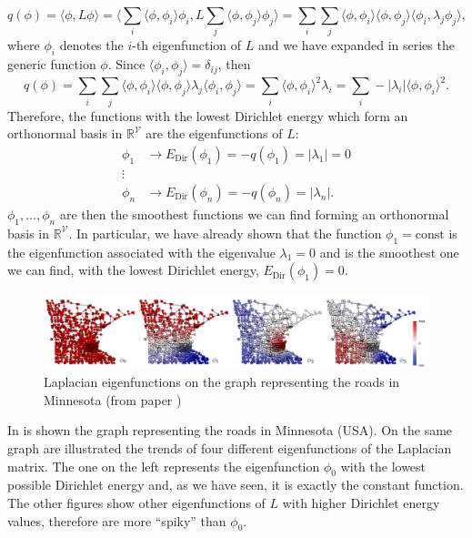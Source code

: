\documentclass[12pt,a4paper]{report}
\theoremstyle{definition}
\begin{document}
\begin{equation*}
    q(\phi) = \langle \phi , L \phi \rangle = 
    \langle \sum _i \langle \phi, \phi _i \rangle \phi _i , L \sum_j \langle \phi, \phi _j \rangle \phi_j \rangle = 
    \sum_i \sum_j \langle \phi, \phi _i \rangle \langle \phi, \phi _j \rangle \langle \phi_i, \lambda_j \phi _j \rangle ,
\end{equation*}
where $\phi_i$ denotes the $i$-th eigenfunction of $L$ and we have expanded in series the generic function $\phi$.
Since $\langle \phi _i, \phi _j \rangle = \delta _{ij}$, then
\begin{equation*}
    q(\phi ) = 
    \sum_i \sum_j \langle \phi, \phi _i \rangle \langle \phi, \phi _j \rangle \lambda_j \langle \phi_i,  \phi _j \rangle = 
    \sum _i \langle \phi, \phi _i \rangle ^2 \lambda _i = 
    \sum _i - | \lambda _i| \langle \phi, \phi _i \rangle ^2 .
\end{equation*}
Therefore, the functions with the lowest Dirichlet energy which form an orthonormal basis in $\mathbb{R}^{\mathcal{V}}$ are the eigenfunctions of $L$:
\begin{align*}
    \phi _1 & \longrightarrow E_{\text{Dir}}(\phi_1) = -q(\phi _1) = |\lambda _1| = 0 \\
    \vdots &  \\
    \phi _n & \longrightarrow  E_{\text{Dir}}(\phi_n) = -q(\phi _n) = |\lambda _n| .
\end{align*}
$\phi_1, \ldots, \phi_n$ are then the smoothest functions we can find forming an orthonormal basis in $\mathbb{R}^{\mathcal{V}}$. In particular, we have already shown that the function $\phi _1 = \text{const}$ is the eigenfunction associated with the eigenvalue $\lambda _1 = 0$ and is the smoothest one we can find, with the lowest Dirichlet energy, $E_{\text{Dir}}(\phi_1) = 0$.

\begin{figure}
    \centering
    \includegraphics[width = \textwidth]{Images/Minnesota.png}
    \caption{Laplacian eigenfunctions on the graph representing the roads in Minnesota (from paper \cite{Beyound_eucl_data})}
    \label{fig:Minnesota}
\end{figure}

In  is shown the graph representing the roads in Minnesota (USA).
On the same graph are illustrated the trends of four different eigenfunctions of the Laplacian matrix.
The one on the left represents the eigenfunction $\phi_0$ with the lowest possible Dirichlet energy and, as we have seen, it is exactly the constant function.
The other figures show other eigenfunctions of $L$ with higher Dirichlet energy values, therefore are more ``spiky'' than $\phi_0$.
\end{document}
